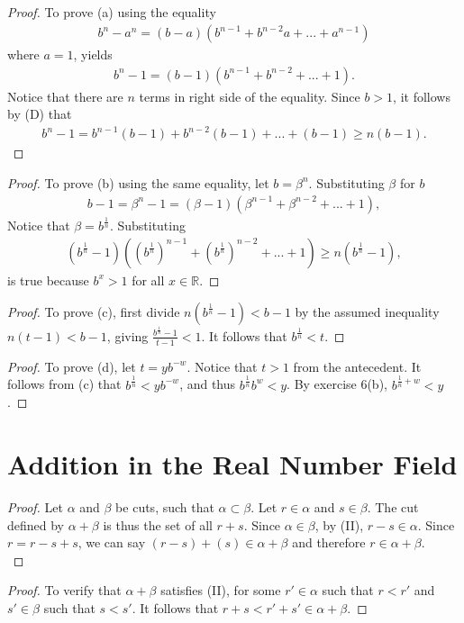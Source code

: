 \documentclass[12pt]{article}
\begin{document}
\subsection{}
\begin{proof}
				To prove (a) using the equality
				\begin{gather*}
								b^n-a^n=(b-a)(b^{n-1}+b^{n-2}a+...+a^{n-1})
				\end{gather*}
				where $a=1$, yields
				\begin{gather*}
								b^n-1=(b-1)(b^{n-1}+b^{n-2}+...+1).
				\end{gather*}
				Notice that there are $n$ terms in right side of the equality. Since $b>1$, 
				it follows by (D) that
				\begin{gather*}
								b^n-1=b^{n-1}(b-1)+b^{n-2}(b-1)+...+(b-1)\geq n(b-1).
				\end{gather*}
\end{proof}
\begin{proof}
				To prove (b) using the same equality, let $b=\beta^n$. 
				Substituting $\beta$ for $b$
				\begin{gather*}
								b-1=\beta^n-1=(\beta-1)(\beta^{n-1}+\beta^{n-2}+...+1),
				\end{gather*}
				Notice that $\beta = b^{\frac{1}{n}}$. Substituting
				\begin{gather*}
								(b^\frac{1}{n}-1)((b^\frac{1}{n})^{n-1}+(b^\frac{1}{n})^{n-2}+...+1)\geq
								n(b^\frac{1}{n}-1),
				\end{gather*}
				is true because $b^x>1$ for all $x\in\mathbb{R}$.
\end{proof}
\begin{proof}
				To prove (c), first divide $n(b^\frac{1}{n}-1)<b-1$ by the assumed inequality $n(t-1)<b-1$,
				giving $\frac{b^\frac{1}{n}-1}{t-1}<1$. It follows that $b^\frac{1}{n}<t$.
\end{proof}
\begin{proof}
				To prove (d), let $t=yb^{-w}$. Notice that $t>1$ from the antecedent. It follows from (c)
				that $b^\frac{1}{n}<yb^{-w}$, and thus $b^\frac{1}{n}b^w<y$. By exercise 6(b),
				$b^{\frac{1}{n}+w}<y$.
\end{proof}



\section{Addition in the Real Number Field}
\begin{proof}
Let $\alpha$ and $\beta$ be cuts, such that $\alpha\subset\beta$. 
Let $r\in\alpha$ and $s\in\beta$. The cut defined by $\alpha+\beta$ is thus the set of all $r+s$. 
Since $\alpha\in\beta$, by (II), $r-s\in\alpha$. Since $r=r-s+s$, we can say $(r-s)+(s)
\in\alpha+\beta$ and therefore $r\in\alpha+\beta$.\\
\end{proof}

\begin{proof}
To verify that $\alpha + \beta$ satisfies (II), for some $r' \in \alpha$ such that $r < r'$ and 
$s' \in \beta$ such that $s < s'$. It follows that $r + s < r' + s' \in \alpha + \beta$.
\end{proof}
\end{document}
